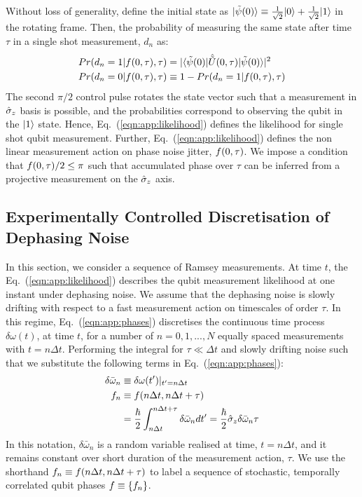 Without loss of generality, define the initial state as  $| \tilde{\psi} (0) \rangle \equiv \frac{1}{\sqrt{2}} | 0 \rangle + \frac{1}{\sqrt{2}} | 1 \rangle$ in the rotating frame. Then, the probability of measuring the same state after time $\tau$ in a single shot measurement, $d_n$ as:
\begin{align} 
Pr(d_n = 1| f(0, \tau), \tau) & = |\langle \tilde{\psi} (0) | \hat{\tilde{U}}(0, \tau) | \tilde{\psi} (0) \rangle|^2 \label{eqn:app:likelihood} \\
Pr(d_n = 0| f(0, \tau), \tau) & \equiv 1 -Pr(d_n = 1| f(0, \tau), \tau)
\end{align}
The second $\pi/2$ control pulse rotates the state vector such that a measurement in $\hat{\sigma}_{z}$ basis is possible, and the probabilities correspond to observing the qubit in the   $| 1 \rangle$ state. Hence, Eq.~(\ref {eqn:app:likelihood}) defines the likelihood for single shot qubit measurement. Further, Eq.~(\ref {eqn:app:likelihood}) defines the non linear measurement action on phase noise jitter, $f(0, \tau)$.  We impose a condition that $f(0, \tau)/2 \leq \pi$  such that accumulated phase over $\tau$ can be inferred from a projective measurement on the $\hat{\sigma}_{z}$ axis. 


\subsection{Experimentally Controlled Discretisation of Dephasing Noise \label{sec:app:exptres}} 
 In this section, we consider a sequence of Ramsey measurements. At time $t$, the Eq.~(\ref {eqn:app:likelihood}) describes the qubit measurement likelihood at one instant under dephasing noise. We assume that the dephasing noise is slowly drifting with respect to a fast measurement action on timescales of order $\tau$. In this regime, Eq.~(\ref {eqn:app:phases}) discretises the continuous time process $\delta\omega(t)$, at time $t$, for a number of $n= 0, 1, ..., N$ equally spaced measurements with $t = n \Delta t$. Performing the integral for $\tau \ll \Delta t$ and slowly drifting noise such that we substitute the following terms in Eq.~(\ref {eqn:app:phases}):
\begin{align}
\delta\bar{\omega}_n &\equiv \delta\omega(t')|_{t'=n \Delta t } \\
f_n &\equiv f(n\Delta t, n\Delta t + \tau) \\
&=\frac{\hbar}{2}  \int_{n\Delta t}^{n\Delta t + \tau} \delta\bar{\omega}_n dt'  = \frac{\hbar}{2}\hat{\sigma}_{z}\delta\bar{\omega}_n \tau \label{eqn:app:phases_constantdetuning}
\end{align}
In this notation, $\delta\bar{\omega}_n $ is a random variable realised at time, $t = n \Delta t$, and it remains constant over short duration of the measurement action, $\tau$.  We use the shorthand $f_n \equiv f(n\Delta t, n\Delta t + \tau)$ to label a sequence of stochastic, temporally correlated qubit phases $ f \equiv \{f_n \}$. 

